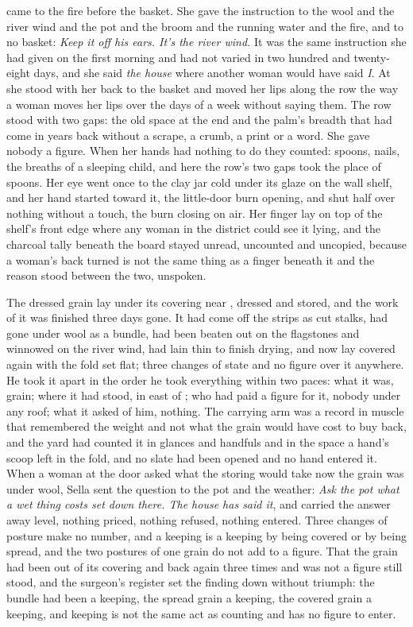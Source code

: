 \scenebreak

 came to the fire before the basket. She gave the instruction to the wool and the river wind and the pot and the broom and the running water and the fire, and to no basket: \emph{Keep it off his ears. It's the river wind.} It was the same instruction she had given on the first morning and had not varied in two hundred and twenty-eight days, and she said \emph{the house} where another woman would have said \emph{I}. At  she stood with her back to the basket and moved her lips along the row the way a woman moves her lips over the days of a week without saying them. The row stood with two gaps: the old space at the end and the palm's breadth that had come in years back without a scrape, a crumb, a print or a word. She gave nobody a figure. When her hands had nothing to do they counted: spoons, nails, the breaths of a sleeping child, and here the row's two gaps took the place of spoons. Her eye went once to the clay jar cold under its glaze on the wall shelf, and her hand started toward it, the little-door burn opening, and shut half over nothing without a touch, the burn closing on air. Her finger lay on top of the shelf's front edge where any woman in the district could see it lying, and the charcoal tally beneath the board stayed unread, uncounted and uncopied, because a woman's back turned is not the same thing as a finger beneath it and the reason stood between the two, unspoken.

The dressed grain lay under its covering near , dressed and stored, and the work of it was finished three days gone. It had come off the strips as cut stalks, had gone under wool as a bundle, had been beaten out on the flagstones and winnowed on the river wind, had lain thin to finish drying, and now lay covered again with the fold set flat; three changes of state and no figure over it anywhere. He took it apart in the order he took everything within two paces: what it was, grain; where it had stood, in  east of ; who had paid a figure for it, nobody under any roof; what it asked of him, nothing. The carrying arm was a record in muscle that remembered the weight and not what the grain would have cost to buy back, and the yard had counted it in glances and handfuls and in the space a hand's scoop left in the fold, and no slate had been opened and no hand entered it. When a woman at the door asked what the storing would take now the grain was under wool, Sella sent the question to the pot and the weather: \emph{Ask the pot what a wet thing costs set down there. The house has said it}, and carried the answer away level, nothing priced, nothing refused, nothing entered. Three changes of posture make no number, and a keeping is a keeping by being covered or by being spread, and the two postures of one grain do not add to a figure. That the grain had been out of its covering and back again three times and was not a figure still stood, and the surgeon's register set the finding down without triumph: the bundle had been a keeping, the spread grain a keeping, the covered grain a keeping, and keeping is not the same act as counting and has no figure to enter.

